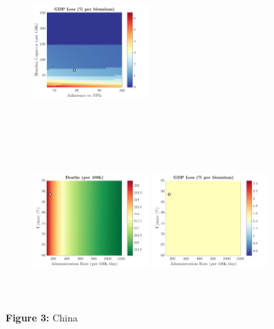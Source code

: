 \documentclass[paper=a4, fontsize=11pt]{scrartcl}
\numberwithin{figure}{section}
\numberwithin{table}{section}
\begin{document}
\begin{figure}[H]
\begin{subfigure}[b]{\textwidth}
	\hspace{0.05cm}
    	\includegraphics[width=0.49\textwidth,height=6cm]{CN/SPANISH/npl_g}
    \end{subfigure}
    \begin{subfigure}[b]{\textwidth}
      	\includegraphics[width=0.49\textwidth,height=6cm]{CN/SPANISH/imm_d}
	\hspace{0.05cm}
    	\includegraphics[width=0.49\textwidth,height=6cm]{CN/SPANISH/imm_g}
    \end{subfigure}
\caption*{\textbf{Figure 3:} China} 
\end{figure}
\end{document}
